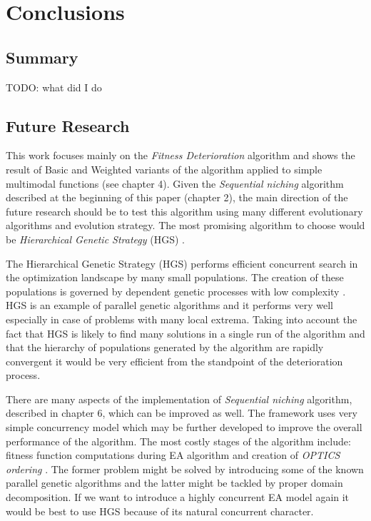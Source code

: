 
\chapter{Conclusions}
\label{Conclusions}

\section{Summary}
TODO: what did I do

\section{Future Research}

This work focuses mainly on the \textit{Fitness Deterioration} algorithm and
shows the result of Basic and Weighted variants of the algorithm applied to
simple multimodal functions (see chapter 4). Given the \textit{Sequential
niching} algorithm described at the beginning of this paper (chapter 2), the main
direction of the future research should be to test this algorithm using many 
different evolutionary algorithms and evolution strategy.
The most promising algorithm to choose would be \textit{Hierarchical Genetic
Strategy} (HGS) \cite{hgs}.

The Hierarchical Genetic Strategy (HGS) performs efficient concurrent
search in the optimization landscape by many small populations. The creation of
these populations is governed by dependent genetic processes with low complexity
\cite{hgs}. HGS is an example of parallel genetic algorithms and it performs
very well especially in case of problems with many local extrema.
Taking into account the fact that HGS is likely to find many solutions in a
single run of the algorithm and that the hierarchy of populations generated
by the algorithm are rapidly convergent it would be very efficient 
from the standpoint of the deterioration process.

There are many aspects of the implementation of \textit{Sequential
niching} algorithm, described in chapter 6, which can be improved as well. 
The framework uses very simple concurrency model which may be further
developed to improve the overall performance of the algorithm.
The most costly stages of the algorithm include: fitness function computations
during EA algorithm and creation of \textit{OPTICS ordering} \cite{optics}.
The former problem might be solved by introducing some of the known
parallel genetic algorithms and the latter might be tackled by proper
domain decomposition. If we want to introduce a highly concurrent EA model
again it would be best to use HGS because of its natural concurrent character.
